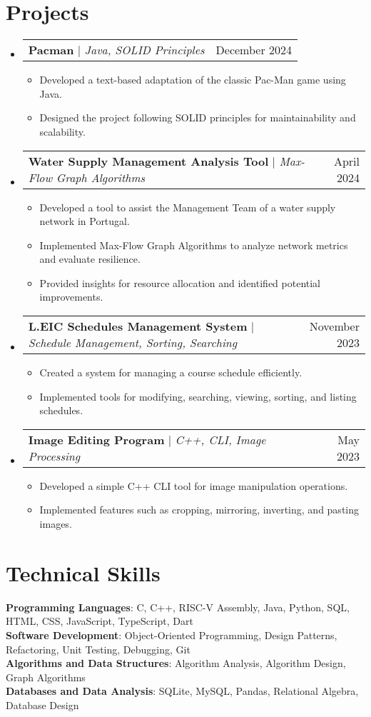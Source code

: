 \documentclass[a4paper,11pt]{article}
\makeatletter
\newcommand{\resumeItem}[1]{
	\item\small{
		{#1 \vspace{-2pt}}
	}
}
\newcommand{\resumeProjectHeading}[2]{
	\item
	\begin{tabular*}{0.97\textwidth}{l@{\extracolsep{\fill}}r}
		\small#1 & #2 \\
	\end{tabular*}\vspace{-7pt}
}
\newcommand{\resumeSubHeadingListStart}{\begin{itemize}[leftmargin=0.15in, label={}]}
\newcommand{\resumeSubHeadingListEnd}{\end{itemize}}
\newcommand{\resumeItemListStart}{\begin{itemize}}
\newcommand{\resumeItemListEnd}{\end{itemize}\vspace{-5pt}}
\makeatother
\begin{document}
\section{Projects}
\resumeSubHeadingListStart%

\resumeProjectHeading%
{\textbf{Pacman} $|$ \emph{Java, SOLID Principles}}{December 2024}
\resumeItemListStart%
\resumeItem{Developed a text-based adaptation of the classic Pac-Man game using Java.}
\resumeItem{Designed the project following SOLID principles for maintainability and scalability.}
\resumeItemListEnd%

\resumeProjectHeading%
{\textbf{Water Supply Management Analysis Tool} $|$ \emph{Max-Flow Graph Algorithms}}{April 2024}
\resumeItemListStart%
\resumeItem{Developed a tool to assist the Management Team of a water supply network in Portugal.}
\resumeItem{Implemented Max-Flow Graph Algorithms to analyze network metrics and evaluate resilience.}
\resumeItem{Provided insights for resource allocation and identified potential improvements.}
\resumeItemListEnd%

\resumeProjectHeading%
{\textbf{L.EIC Schedules Management System} $|$ \emph{Schedule Management, Sorting, Searching}}{November 2023}
\resumeItemListStart%
\resumeItem{Created a system for managing a course schedule efficiently.}
\resumeItem{Implemented tools for modifying, searching, viewing, sorting, and listing schedules.}
\resumeItemListEnd%

\resumeProjectHeading%
{\textbf{Image Editing Program} $|$ \emph{C++, CLI, Image Processing}}{May 2023}
\resumeItemListStart%
\resumeItem{Developed a simple C++ CLI tool for image manipulation operations.}
\resumeItem{Implemented features such as cropping, mirroring, inverting, and pasting images.}
\resumeItemListEnd%

\resumeSubHeadingListEnd%

\section{Technical Skills}
\begin{itemize}[leftmargin=0.15in, label={}]
	\small{\item{
	      \textbf{Programming Languages}{: C, C++, RISC-V Assembly, Java, Python, SQL, HTML, CSS, JavaScript, TypeScript, Dart} \\
	      \textbf{Software Development}{: Object-Oriented Programming, Design Patterns, Refactoring, Unit Testing, Debugging, Git} \\
	      \textbf{Algorithms and Data Structures}{: Algorithm Analysis, Algorithm Design, Graph Algorithms} \\
	      \textbf{Databases and Data Analysis}{: SQLite, MySQL, Pandas, Relational Algebra, Database Design}
	      }}
\end{itemize}

\end{document}
